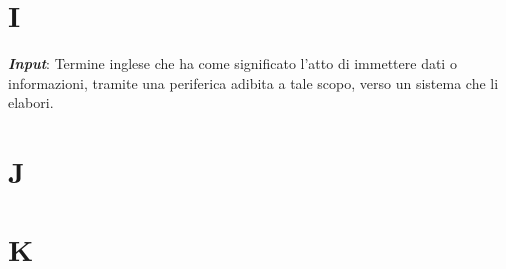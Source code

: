 \documentclass[5pt]{article}
\begin{document}
\pagebreak

\section*{I}
\begin{flushleft}
	
\textbf{\textit{Input}}: Termine inglese che ha come significato l'atto di immettere dati o informazioni, tramite una periferica adibita a tale scopo, verso un sistema che li elabori.

\end{flushleft}

\pagebreak

\section*{J}
\begin{flushleft}
	
\end{flushleft}

\pagebreak

\section*{K}
\begin{flushleft}
	
\end{flushleft}

\pagebreak
\end{document}
